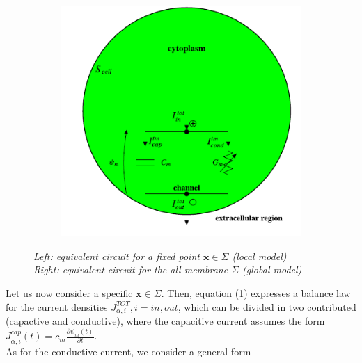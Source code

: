 \documentclass[a4paper]{article}
\begin{document}
\begin{figure}[H]
\begin{minipage}{\linewidth}
\begin{minipage}{0.45\linewidth}
\begin{figure}[H]
			\end{figure}
		\end{minipage}
		\hspace{0.05\linewidth}
		\begin{minipage}{0.48\linewidth}
			\begin{figure}[H]
				\includegraphics[width=\linewidth]{global_circuit.png}
				
			\end{figure}
		\end{minipage}
		
	\end{minipage}
	\caption{\textit{Left: equivalent circuit for a fixed point $\textbf{x} \in \Sigma$ (local model)  \\
			Right: equivalent circuit for the all membrane  $\Sigma$ (global model)}}
\end{figure}


Let us now consider a specific $\textbf{x} \in \Sigma$. Then, equation (1) expresses a balance law for the current densities $J_{\alpha,i}^{TOT}, i= in,out$, which can be divided in two contributed (capactive and conductive), where the capacitive current assumes the form $J^{cap}_{\alpha,i}(t) = c_m \frac{\partial \psi_m(t)}{\partial t}$.\\
As for the conductive current, we consider a general form 
\end{document}
